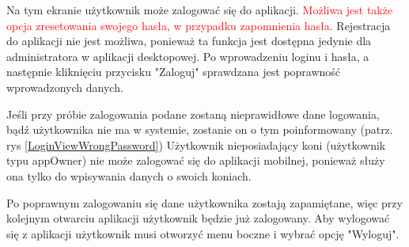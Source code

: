 \documentclass[12pt,twoside]{report}
\begin{document}
Na tym ekranie użytkownik może zalogować się do aplikacji. \textcolor{red}{Możliwa jest także opcja zresetowania swojego hasła, w przypadku zapomnienia hasła}. Rejestracja do aplikacji nie jest możliwa, ponieważ ta funkcja jest dostępna jedynie dla administratora w aplikacji desktopowej. Po wprowadzeniu loginu i hasła, a następnie kliknięciu przycisku "Zaloguj" sprawdzana jest poprawność wprowadzonych danych. 

Jeśli przy próbie zalogowania podane zostaną nieprawidłowe dane logowania, bądź użytkownika nie ma w systemie, zostanie on o tym poinformowany (patrz. rys \ref{LoginViewWrongPassword})
Użytkownik nieposiadający koni (użytkownik typu appOwner) nie może zalogować się do aplikacji mobilnej, ponieważ służy ona tylko do wpisywania danych o swoich koniach.

Po poprawnym zalogowaniu się dane użytkownika zostają zapamiętane, więc przy kolejnym otwarciu aplikacji użytkownik będzie już zalogowany.
Aby wylogować się z aplikacji użytkownik musi otworzyć menu boczne i wybrać opcję "Wyloguj".
\end{document}
